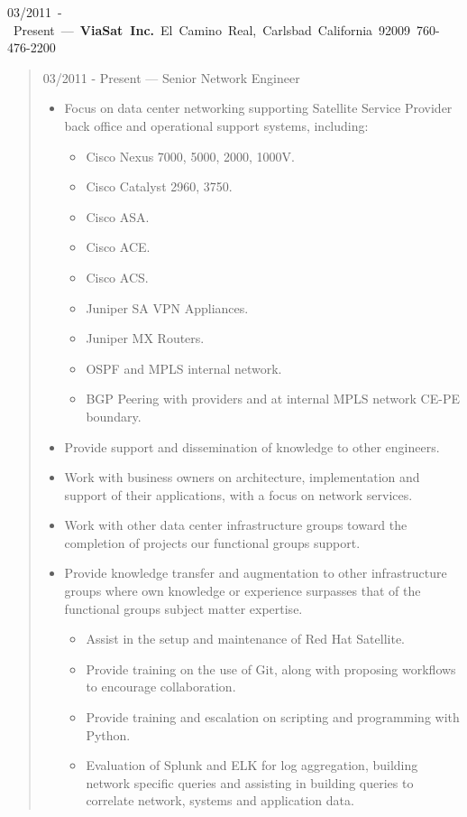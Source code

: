 \mbox{03/2011 - Present --- {\bf ViaSat Inc.} El Camino Real, Carlsbad California 92009 760-476-2200}
\begin{quote}
03/2011 - Present --- Senior Network Engineer\\
\begin{itemize}
\item Focus on data center networking supporting Satellite Service Provider
back office and operational support systems, including:
\begin{itemize}
\item Cisco Nexus 7000, 5000, 2000, 1000V.
\item Cisco Catalyst 2960, 3750.
\item Cisco ASA.
\item Cisco ACE.
\item Cisco ACS.
\item Juniper SA VPN Appliances.
\item Juniper MX Routers.
\item OSPF and MPLS internal network.
\item BGP Peering with providers and at internal MPLS network CE-PE boundary.
\end{itemize}
\item Provide support and dissemination of knowledge to other engineers.
\item Work with business owners on architecture, implementation and support of
their applications, with a focus on network services.
\item Work with other data center infrastructure groups toward the completion of
projects our functional groups support.
\item Provide knowledge transfer and augmentation to other infrastructure groups
where own knowledge or experience surpasses that of the functional groups
subject matter expertise.
\begin{itemize}
\item Assist in the setup and maintenance of Red Hat Satellite.
\item Provide training on the use of Git, along with proposing workflows to
encourage collaboration.
\item Provide training and escalation on scripting and programming with Python.
\item Evaluation of Splunk and ELK for log aggregation, building network
specific queries and assisting in building queries to correlate network,
systems and application data.
\end{itemize}

\end{itemize}
\end{quote}
